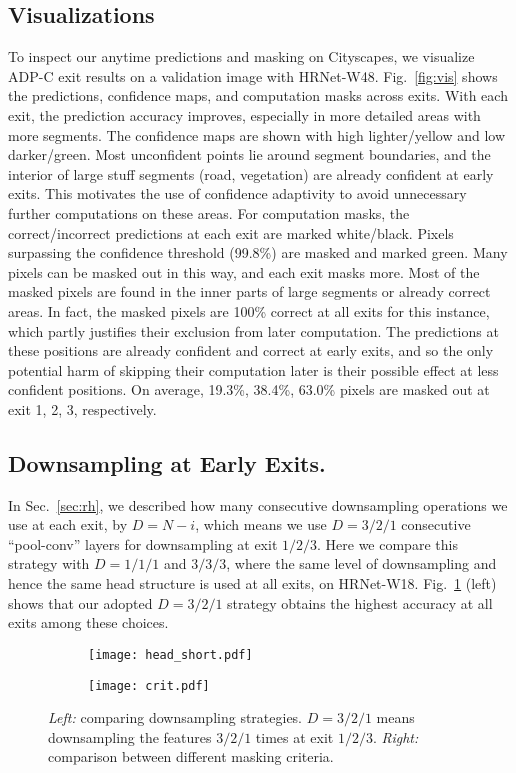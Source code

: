 \subsection{Visualizations} 
To inspect our anytime predictions and masking on Cityscapes, we visualize ADP-C exit results on a validation image with HRNet-W48.
Fig.~\ref{fig:vis} shows the predictions, confidence maps, and computation masks across exits.
With each exit, the prediction accuracy improves, especially in more detailed areas with more segments.
The confidence maps are shown with high lighter/yellow and low darker/green.
Most unconfident points lie around segment boundaries, and the interior of large stuff segments (road, vegetation) are already confident at early exits.
This motivates the use of confidence adaptivity to avoid unnecessary further computations on these areas.
For computation masks, the correct/incorrect predictions at each exit are marked white/black.
Pixels surpassing the confidence threshold (99.8\%) are masked and marked green.
Many pixels can be masked out in this way, and each exit masks more.
Most of the masked pixels are found in the inner parts of large segments or already correct areas.
In fact, the masked pixels are 100\% correct at all exits for this instance, which partly justifies their exclusion from later computation.
The predictions at these positions are already confident and correct at early exits, and so the only potential harm of skipping their computation later is their possible effect at less confident positions.
On average, 19.3\%, 38.4\%, 63.0\% pixels are masked out at exit 1, 2, 3, respectively.



\subsection{Downsampling at Early Exits.}
In Sec.~\ref{sec:rh}, we described how many consecutive downsampling operations we use at each exit, by $D = N -i$, which means we use $D=3/2/1$ consecutive ``pool-conv'' layers for downsampling at exit $1/2/3$.
Here we compare this strategy with $D=1/1/1$ and $3/3/3$, where the same level of downsampling and hence the same head structure is used at all exits, on HRNet-W18. 
Fig.~\ref{fig:twofigs} (left) shows that our adopted $D=3/2/1$ strategy obtains the highest accuracy at all exits among these choices.


\begin{figure}[htbp]
\centering
   \begin{subfigure}{0.45\linewidth} \centering
     \texttt{[image: head\_short.pdf]}
   \end{subfigure}
   \begin{subfigure}{0.45\linewidth} \centering
     \texttt{[image: crit.pdf]}
   \end{subfigure}
\caption{\emph{Left:} comparing downsampling strategies. $D=3/2/1$ means downsampling the features $3/2/1$ times at exit $1/2/3$. \emph{Right:} comparison between different masking criteria.} 
\label{fig:twofigs}
\end{figure}

